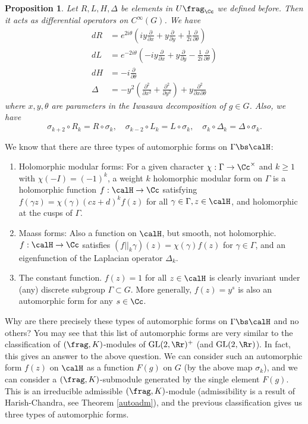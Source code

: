 \documentclass{article}
\newcommand{\GL}{\mathrm{GL}}
\newtheorem{proposition}{Proposition}[section]
\begin{document}
\begin{proposition}
Let $R, L, H, \Delta$ be elements in $U\frag_{\Cc}$ we defined before. Then it acts as differential operators on $C^{\infty}(G)$. 
We have 
\begin{align*}
dR &= e^{2i\theta} \left( iy \frac{\partial}{\partial x} + y\frac{\partial}{\partial y} + \frac{1}{2i} \frac{\partial}{\partial \theta}\right) \\
dL &= e^{-2i\theta} \left(-iy \frac{\partial}{\partial x} + y \frac{\partial}{\partial y} - \frac{1}{2i}\frac{\partial}{\partial \theta}\right) \\
dH & = -i\frac{\partial}{\partial\theta} \\
\Delta &= -y^{2}\left( \frac{\partial^{2}}{\partial x^{2}} + \frac{\partial^{2}}{\partial y^{2}}\right) + y\frac{\partial^{2}}{\partial x \partial \theta} 
\end{align*} 
where $x, y, \theta$ are parameters in the Iwasawa decomposition of $g\in G$. 
Also, we have
$$
\sigma_{k+2} \circ R_k = R\circ \sigma_k, \quad \sigma_{k-2} \circ L_k = L \circ \sigma_k, \quad \sigma_k \circ \Delta_k = \Delta \circ \sigma_k. 
$$
\end{proposition}

We know that there are three types of automorphic forms on $\Gamma \bs \calH$:
\begin{enumerate}
\item Holomorphic modular forms: For a given character $\chi:\Gamma \to \Cc^{\times}$ and $k\geq 1$ with $\chi(-I) = (-1)^{k}$, a weight $k$ holomorphic modular form on $\Gamma$ is a holomorphic function $f:\calH \to \Cc$ satisfying $f(\gamma z) = \chi(\gamma)(cz+d)^{k}f(z)$ for all $\gamma\in \Gamma, z\in \calH$, and holomorphic at the cusps of $\Gamma$. 
\item Maass forms: Also a function on $\calH$, but smooth, not holomorphic. $f:\calH \to \Cc$ satisfies $(f||_{k}\gamma)(z) = \chi(\gamma)f(z)$ for $\gamma\in \Gamma$, and an eigenfunction of the Laplacian operator $\Delta_k$. 
\item The constant function. $f(z) = 1$ for all $z\in \calH$ is clearly invariant under (any) discrete subgroup $\Gamma \subset G$. 
More generally, $f(z) = y^{s}$ is also  an automorphic form for any $s\in \Cc$.
\end{enumerate}
Why are there precisely these types of automorphic forms on $\Gamma \bs \calH$ and no others? 
You may see that this list of automorphic forms are very similar to the classification of $(\frag, K)$-modules of $\GL(2, \Rr)^{+}$ (and $\GL(2, \Rr)$). 
In fact, this gives an answer to the above question. 
We can consider such an automorphic form $f(z)$ on $\calH$ as  a function $F(g)$ on $G$ (by the above map $\sigma_k$), and we can consider a $(\frag, K)$-submodule generated by the single element $F(g)$. 
This is an irreducible admissible $(\frag, K)$-module (admissibility is a result of Harish-Chandra, see Theorem \ref{autoadm}), and the previous classification gives us three types of automorphic forms. 
\end{document}
